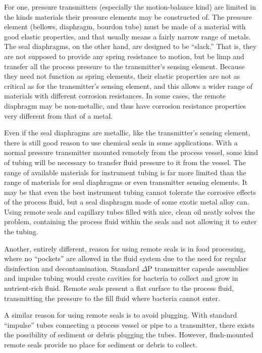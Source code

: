 For one, pressure transmitters (especially the motion-balance kind) are limited in the kinds materials their pressure elements may be constructed of.  The pressure element (bellows, diaphragm, bourdon tube) must be made of a material with good elastic properties, and that usually means a fairly narrow range of metals.  The seal diaphragms, on the other hand, are designed to be ``slack.''  That is, they are not supposed to provide any spring resistance to motion, but be limp and transfer all the process pressure to the transmitter's sensing element.  Because they need not function as spring elements, their elastic properties are not as critical as for the transmitter's sensing element, and this allows a wider range of materials with different corrosion resistances.  In some cases, the remote diaphragm may be non-metallic, and thus have corrosion resistance properties very different from that of a metal.

Even if the seal diaphragms are metallic, like the transmitter's sensing element, there is still good reason to use chemical seals in some applications.  With a normal pressure transmitter mounted remotely from the process vessel, some kind of tubing will be necessary to transfer fluid pressure to it from the vessel.  The range of available materials for instrument tubing is far more limited than the range of materials for seal diaphragms or even transmitter sensing elements.  It may be that even the best instrument tubing cannot tolerate the corrosive effects of the process fluid, but a seal diaphragm made of some exotic metal alloy can.  Using remote seals and capillary tubes filled with nice, clean oil neatly solves the problem, containing the process fluid within the seals and not allowing it to enter the tubing.

Another, entirely different, reason for using remote seals is in food processing, where no ``pockets'' are allowed in the fluid system due to the need for regular disinfection and decontamination.  Standard $\Delta$P transmitter capsule assemblies and impulse tubing would create cavities for bacteria to collect and grow in nutrient-rich fluid.  Remote seals present a flat surface to the process fluid, transmitting the pressure to the fill fluid where bacteria cannot enter.

A similar reason for using remote seals is to avoid plugging.  With standard ``impulse'' tubes connecting a process vessel or pipe to a transmitter, there exists the possibility of sediment or debris plugging the tubes.  However, flush-mounted remote seals provide no place for sediment or debris to collect.











